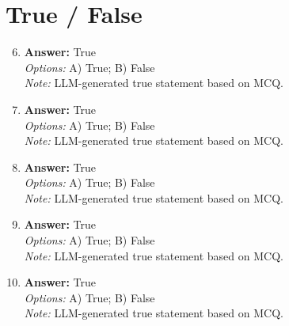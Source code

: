 \documentclass[12pt]{article}
\begin{document}
\section*{True / False}
\begin{enumerate}[label=\arabic*.]
\setcounter{enumi}{5}
\item \textbf{Answer:} True
\\ \textit{Options:} A) True; B) False
\\ \textit{Note:} LLM-generated true statement based on MCQ.
\item \textbf{Answer:} True
\\ \textit{Options:} A) True; B) False
\\ \textit{Note:} LLM-generated true statement based on MCQ.
\item \textbf{Answer:} True
\\ \textit{Options:} A) True; B) False
\\ \textit{Note:} LLM-generated true statement based on MCQ.
\item \textbf{Answer:} True
\\ \textit{Options:} A) True; B) False
\\ \textit{Note:} LLM-generated true statement based on MCQ.
\item \textbf{Answer:} True
\\ \textit{Options:} A) True; B) False
\\ \textit{Note:} LLM-generated true statement based on MCQ.
\end{enumerate}
\end{document}
